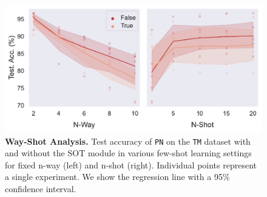 \begin{figure}[h!]
    \centering
    \includegraphics[width=1\columnwidth]{figures/way-shot.pdf}
    \caption{\textbf{Way-Shot Analysis.} Test accuracy of \texttt{PN} on the \texttt{TM} dataset with and without the SOT module in various 
    few-shot learning settings for fixed n-way (left) and n-shot (right). Individual points represent a single experiment. We show the regression line with a 95\% confidence interval.}
    \label{fig:way-shot}
\end{figure}
